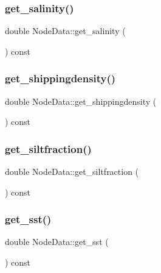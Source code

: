 \subsubsection{\texorpdfstring{get\_salinity()}{get\_salinity()}}
{\footnotesize\ttfamily double Node\+Data\+::get\+\_\+salinity (\begin{DoxyParamCaption}{ }\end{DoxyParamCaption}) const\hspace{0.3cm}{\ttfamily [inline]}}

\mbox{\label{class_node_data_a2ae0509c1ad36427721cef2946d0e53f}} 
\subsubsection{\texorpdfstring{get\_shippingdensity()}{get\_shippingdensity()}}
{\footnotesize\ttfamily double Node\+Data\+::get\+\_\+shippingdensity (\begin{DoxyParamCaption}{ }\end{DoxyParamCaption}) const\hspace{0.3cm}{\ttfamily [inline]}}

\mbox{\label{class_node_data_a29fed1328e789db030143d1eab31f4b4}} 
\subsubsection{\texorpdfstring{get\_siltfraction()}{get\_siltfraction()}}
{\footnotesize\ttfamily double Node\+Data\+::get\+\_\+siltfraction (\begin{DoxyParamCaption}{ }\end{DoxyParamCaption}) const\hspace{0.3cm}{\ttfamily [inline]}}

\mbox{\label{class_node_data_ab0fb11992feff6f3d4aeba901c5c984e}} 
\subsubsection{\texorpdfstring{get\_sst()}{get\_sst()}}
{\footnotesize\ttfamily double Node\+Data\+::get\+\_\+sst (\begin{DoxyParamCaption}{ }\end{DoxyParamCaption}) const\hspace{0.3cm}{\ttfamily [inline]}}

